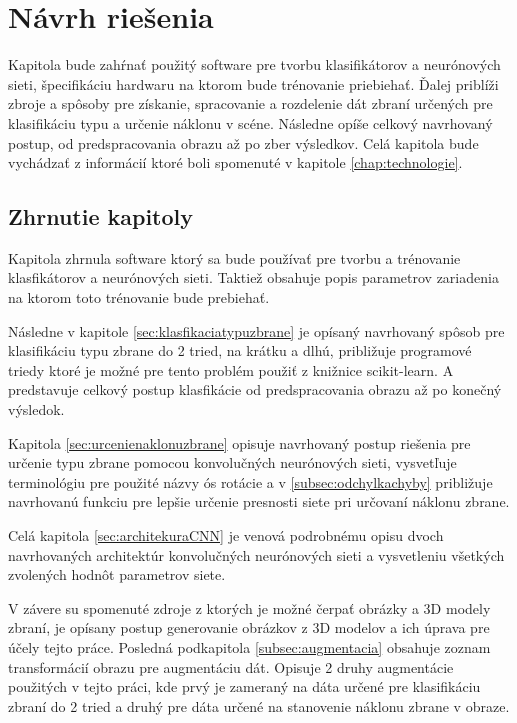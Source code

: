 \chapter{Návrh riešenia}
Kapitola bude zahŕnať použitý software pre tvorbu klasifikátorov a neurónových sieti, špecifikáciu hardwaru na ktorom bude trénovanie priebiehať.
Ďalej priblíži zbroje a spôsoby pre získanie, spracovanie a rozdelenie dát zbraní určených pre klasifikáciu typu a určenie náklonu v scéne.
Následne opíše celkový navrhovaný postup, od predspracovania obrazu až po zber výsledkov.
Celá kapitola bude vychádzať z informácií ktoré boli spomenuté v kapitole \ref{chap:technologie}.












\section{Zhrnutie kapitoly}

Kapitola zhrnula software ktorý sa bude používať pre tvorbu a trénovanie klasfikátorov a neurónových sieti.
Taktiež obsahuje popis parametrov zariadenia na ktorom toto trénovanie bude prebiehať.

Následne v kapitole \ref{sec:klasfikaciatypuzbrane} je opísaný navrhovaný spôsob pre klasifikáciu typu zbrane do 2 tried, na krátku a dlhú, približuje
    programové triedy ktoré je možné pre tento problém použiť z knižnice scikit-learn.
A predstavuje celkový postup klasfikácie od predspracovania obrazu až po konečný výsledok.

Kapitola \ref{sec:urcenienaklonuzbrane} opisuje navrhovaný postup riešenia pre určenie typu zbrane pomocou konvolučných neurónových sieti,
    vysvetľuje terminológiu pre použité názvy ós rotácie a v \ref{subsec:odchylkachyby} približuje navrhovanú funkciu pre lepšie určenie presnosti siete
    pri určovaní náklonu zbrane.

Celá kapitola \ref{sec:architekuraCNN} je venová podrobnému opisu dvoch navrhovaných architektúr konvolučných neurónových sieti a
    vysvetleniu všetkých zvolených hodnôt parametrov siete.

V závere su spomenuté zdroje z ktorých je možné čerpať obrázky a 3D modely zbraní, je opísany postup generovanie obrázkov z 3D modelov a ich úprava
    pre účely tejto práce.
Posledná podkapitola \ref{subsec:augmentacia} obsahuje zoznam transformácií obrazu pre augmentáciu dát.
Opisuje 2 druhy augmentácie použitých v tejto práci, kde prvý je zameraný na dáta určené pre klasifikáciu zbraní do 2 tried a druhý pre dáta
    určené na stanovenie náklonu zbrane v obraze.


